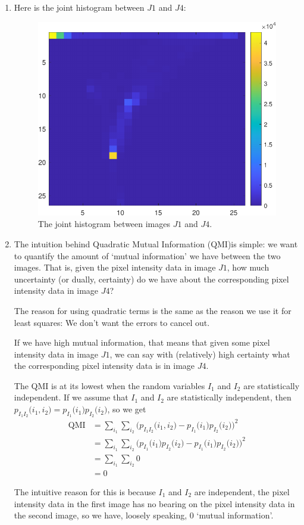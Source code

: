 \documentclass[a4paper]{article}
\begin{document}
\begin{enumerate}[label=(\alph*)]
\item Here is the joint histogram between $J1$ and $J4$:
\begin{figure}[H]
\centering
\includegraphics[scale=0.95]{histogram.pdf}
\caption{The joint histogram between images $J1$ and $J4$.}
\end{figure}

\item The intuition behind Quadratic Mutual Information (QMI)is simple: we want to quantify the amount of `mutual information' we have between the two images. That is, given the pixel intensity data in image $J1$, how much uncertainty (or dually, certainty) do we have about the corresponding pixel intensity data in image $J4$?

The reason for using quadratic terms is the same as the reason we use it for least squares: We don't want the errors to cancel out.

If we have high mutual information, that means that given some pixel intensity data in image $J1$, we can say with (relatively) high certainty what the corresponding pixel intensity data is in image $J4$.

The QMI is at its lowest when the random variables $I_1$ and $I_2$ are statistically independent. If we assume that $I_1$ and $I_2$ are statistically independent, then $p_{I_1 I_2}\big( i_1, i_2\big) = p_{I_1}\big( i_1\big)p_{I_2}\big( i_2\big)$, so we get
\begin{align*}
\text{QMI} &= \sum\limits_{i_1} \sum\limits_{i_2} \Big( p_{I_1 I_2}\big( i_1, i_2\big) - p_{I_1}\big( i_1\big)p_{I_2}\big( i_2\big) \Big)^2 \nonumber \\
&= \sum\limits_{i_1} \sum\limits_{i_2} \Big( p_{I_1}\big( i_1\big)p_{I_2}\big( i_2\big) - p_{I_1}\big( i_1\big)p_{I_2}\big( i_2\big) \Big)^2 \\
&= \sum\limits_{i_1} \sum\limits_{i_2} 0 \\
&= 0
\end{align*}

The intuitive reason for this is because $I_1$ and $I_2$ are independent, the pixel intensity data in the first image has no bearing on the pixel intensity data in the second image, so we have, loosely speaking, 0 `mutual information'.
\end{enumerate}
\end{document}
